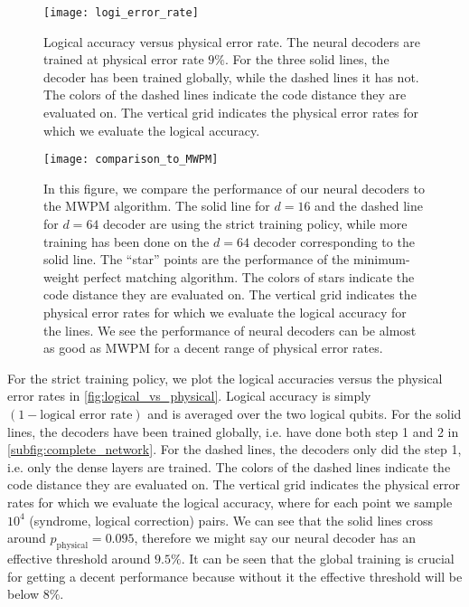 \begin{figure}
	\texttt{[image: logi\_error\_rate]}
	\caption{Logical accuracy versus physical error rate.
		The neural decoders are trained at physical error rate $9\%$.
		For the three solid lines, the decoder has been trained globally, while the dashed lines it has not.
		The colors of the dashed lines indicate the code distance they are evaluated on.
		The vertical grid indicates the physical error rates for which we evaluate the logical accuracy.
	}
\label{fig:logical_vs_physical}
\end{figure}

\begin{figure}
	\texttt{[image: comparison\_to\_MWPM]}
	\caption{In this figure, we compare the performance of our neural decoders to the MWPM algorithm.
		The solid line for $d=16$ and the dashed line for $d=64$ decoder are using the strict training policy, while more training has been done on  the $d=64$ decoder corresponding to the solid line.
		The ``star'' points are the performance of the minimum-weight perfect matching algorithm.
		The colors of stars indicate the code distance they are evaluated on.
		The vertical grid indicates the physical error rates for which we evaluate the logical accuracy for the lines.
		We see the performance of neural decoders can be almost as good as MWPM for a decent range of physical error rates.
	}
	\label{fig:comparison_to_MWPM}
\end{figure}

For the strict training policy, we plot the logical accuracies versus the physical error rates in \autoref{fig:logical_vs_physical}.
Logical accuracy is simply $(1-\text{logical error rate})$ and is averaged over the two logical qubits.
For the solid lines, the decoders have been trained globally, i.e. have done both step 1 and 2 in \autoref{subfig:complete_network}.
For the dashed lines, the decoders only did the step 1, i.e. only the dense layers are trained.
The colors of the dashed lines indicate the code distance they are evaluated on.
The vertical grid indicates the physical error rates for which we evaluate the logical accuracy, where for each point we sample $10^4$ (syndrome, logical correction) pairs.
We can see that the solid lines cross around $p_{\text{physical}}=0.095$, therefore we might say our neural decoder has an effective threshold around $9.5\%$.
It can be seen that the global training is crucial for getting a decent performance because without it the effective threshold will be below $8\%$.

